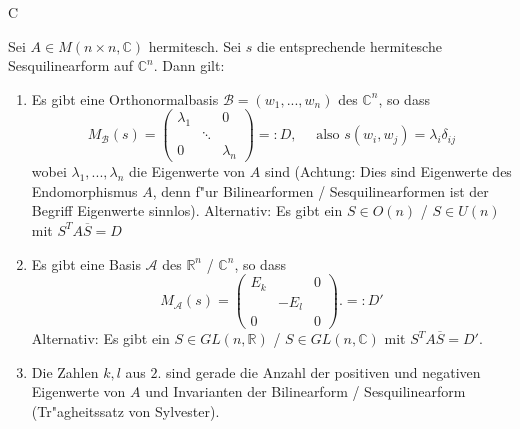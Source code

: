 \documentclass[9pt, a4paper, twocolumn, landscape]{article}
\begin{document}
{C
\begin{theorem} 
Sei $A \in M (n \times n, \mathbb{C} )$ hermitesch. Sei $s$ die entsprechende hermitesche Sesquilinearform auf $\mathbb{C}^n$. Dann gilt:
\begin{enumerate}
\item Es gibt eine Orthonormalbasis $\mathcal{B} = (w_1, ..., w_n)$ des $\mathbb{C}^n$, so dass 
$$
M_\mathcal{B}(s) = \left(\begin{array}{ccc}\lambda_{1} & & 0  
\\ & \ddots & 
\\ 0 & & \lambda_{n}\end{array}\right) =:D, \quad \text{ also } s(w_i, w_j) = \lambda_i \delta_{ij}
$$
wobei $\lambda_1, ..., \lambda_n$ die Eigenwerte von $A$ sind (Achtung: Dies sind Eigenwerte des Endomorphismus $A$, denn f"ur Bilinearformen / Sesquilinearformen ist der Begriff Eigenwerte sinnlos).
Alternativ: Es gibt ein $S \in O(n)$ / $S \in U(n)$ mit $S^T A \overline{S} = D$
\item Es gibt eine Basis $\mathcal{A}$ des  $\mathbb{R}^n$ / $\mathbb{C}^n$, so dass
$$
M_\mathcal{A}(s) =  \left(\begin{array}{ccc}E_k & & 0 
\\ & -E_l & 
\\ 0 & & 0\end{array}\right). =: D' 
$$
Alternativ: Es gibt ein $S \in GL(n, \mathbb{R})$ / $S \in GL(n, \mathbb{C})$ mit $S^T A \overline{S} = D'$.
\item Die Zahlen $k, l$ aus $2.$ sind gerade die Anzahl der positiven und negativen Eigenwerte von $A$ und Invarianten der Bilinearform / Sesquilinearform (Tr"agheitssatz von Sylvester).
\end{enumerate}
\end{theorem}

}
\end{document}
